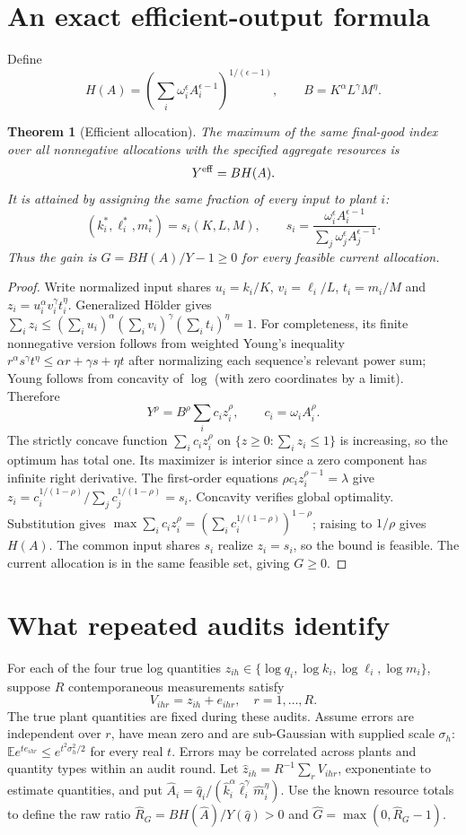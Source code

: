 \documentclass[11pt]{article}
\newtheorem{theorem}{Theorem}
\theoremstyle{remark}\newtheorem{remark}[theorem]{Remark}
\newcommand{\E}{\mathbb E}
\begin{document}
\section{An exact efficient-output formula}
Define
\[
 H(A)=\left(\sum_i\omega_i^\epsilon A_i^{\epsilon-1}\right)^{1/(\epsilon-1)},
 \qquad B=K^\alpha L^\gamma M^\eta.
\]
\begin{theorem}[Efficient allocation]\label{efficient}
The maximum of the same final-good index over all nonnegative allocations with the specified aggregate resources is
\[
 Y^{\rm eff}=B H(A).
\]
It is attained by assigning the same fraction of every input to plant $i$:
\[
 (k_i^*,\ell_i^*,m_i^*)=s_i(K,L,M),\qquad
 s_i=\frac{\omega_i^\epsilon A_i^{\epsilon-1}}
              {\sum_j\omega_j^\epsilon A_j^{\epsilon-1}}.
\]
Thus the gain is $G=BH(A)/Y-1\geq0$ for every feasible current allocation.
\end{theorem}
\begin{proof}
Write normalized input shares $u_i=k_i/K$, $v_i=\ell_i/L$, $t_i=m_i/M$ and $z_i=u_i^\alpha v_i^\gamma t_i^\eta$. Generalized H\"older gives
$\sum_i z_i\leq(\sum_i u_i)^\alpha(\sum_i v_i)^\gamma(\sum_i t_i)^\eta=1$.
For completeness, its finite nonnegative version follows from weighted Young's inequality $r^\alpha s^\gamma t^\eta\leq\alpha r+\gamma s+\eta t$ after normalizing each sequence's relevant power sum; Young follows from concavity of $\log$ (with zero coordinates by a limit).
Therefore
\[
 Y^\rho=B^\rho\sum_i c_i z_i^\rho,
                    \qquad c_i=\omega_i A_i^\rho.
\]
The strictly concave function $\sum_i c_i z_i^\rho$ on $\{z\geq0:\sum_i z_i\leq1\}$ is increasing, so the optimum has total one. Its maximizer is interior since a zero component has infinite right derivative. The first-order equations $\rho c_i z_i^{\rho-1}=\lambda$ give
$z_i=c_i^{1/(1-\rho)}/\sum_jc_j^{1/(1-\rho)}=s_i$.
Concavity verifies global optimality. Substitution gives
$\max\sum_i c_i z_i^\rho=(\sum_i c_i^{1/(1-\rho)})^{1-\rho}$;
raising to $1/\rho$ gives $H(A)$. The common input shares $s_i$ realize $z_i=s_i$, so the bound is feasible. The current allocation is in the same feasible set, giving $G\geq0$.
\end{proof}

\section{What repeated audits identify}
For each of the four true log quantities $z_{ih}\in\{\log q_i,\log k_i,\log\ell_i,\log m_i\}$, suppose $R$ contemporaneous measurements satisfy
\[
 V_{ihr}=z_{ih}+e_{ihr},\quad r=1,\ldots,R.
\]
The true plant quantities are fixed during these audits. Assume errors are independent over $r$, have mean zero and are sub-Gaussian with supplied scale $\sigma_h$:
$\E e^{t e_{ihr}}\leq e^{t^2\sigma_h^2/2}$ for every real $t$.
Errors may be correlated across plants and quantity types within an audit round. Let $\widehat z_{ih}=R^{-1}\sum_rV_{ihr}$, exponentiate to estimate quantities, and put
$\widehat A_i=\widehat q_i/(\widehat k_i^\alpha\widehat\ell_i^\gamma\widehat m_i^\eta)$.
Use the known resource totals to define the raw ratio
$\widehat R_G=BH(\widehat A)/Y(\widehat q)>0$ and
$\widehat G=\max(0,\widehat R_G-1)$.
\end{document}
